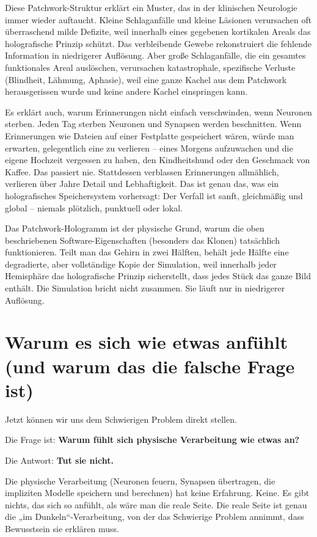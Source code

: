 \documentclass[11pt, twoside, openright]{book}
\begin{document}
Diese Patchwork-Struktur erklärt ein Muster, das in der klinischen Neurologie immer wieder auftaucht. Kleine Schlaganfälle und kleine Läsionen verursachen oft überraschend milde Defizite, weil innerhalb eines gegebenen kortikalen Areals das holografische Prinzip schützt. Das verbleibende Gewebe rekonstruiert die fehlende Information in niedrigerer Auflösung. Aber große Schlaganfälle, die ein gesamtes funktionales Areal auslöschen, verursachen katastrophale, spezifische Verluste (Blindheit, Lähmung, Aphasie), weil eine ganze Kachel aus dem Patchwork herausgerissen wurde und keine andere Kachel einspringen kann.

Es erklärt auch, warum Erinnerungen nicht einfach verschwinden, wenn Neuronen sterben. Jeden Tag sterben Neuronen und Synapsen werden beschnitten. Wenn Erinnerungen wie Dateien auf einer Festplatte gespeichert wären, würde man erwarten, gelegentlich eine zu verlieren -- eines Morgens aufzuwachen und die eigene Hochzeit vergessen zu haben, den Kindheitshund oder den Geschmack von Kaffee. Das passiert nie. Stattdessen verblassen Erinnerungen allmählich, verlieren über Jahre Detail und Lebhaftigkeit. Das ist genau das, was ein holografisches Speichersystem vorhersagt: Der Verfall ist sanft, gleichmäßig und global -- niemals plötzlich, punktuell oder lokal.

Das Patchwork-Hologramm ist der physische Grund, warum die oben beschriebenen Software-Eigenschaften (besonders das Klonen) tatsächlich funktionieren. Teilt man das Gehirn in zwei Hälften, behält jede Hälfte eine degradierte, aber vollständige Kopie der Simulation, weil innerhalb jeder Hemisphäre das holografische Prinzip sicherstellt, dass jedes Stück das ganze Bild enthält. Die Simulation bricht nicht zusammen. Sie läuft nur in niedrigerer Auflösung.

\chapter{Warum es sich wie etwas anfühlt (und warum das die falsche Frage ist)}

Jetzt können wir uns dem Schwierigen Problem direkt stellen.

Die Frage ist: \textbf{Warum fühlt sich physische Verarbeitung wie etwas an?}

Die Antwort: \textbf{Tut sie nicht.}

Die physische Verarbeitung (Neuronen feuern, Synapsen übertragen, die impliziten Modelle speichern und berechnen) hat keine Erfahrung. Keine. Es gibt nichts, das sich so anfühlt, als wäre man die reale Seite. Die reale Seite ist genau die „im Dunkeln“-Verarbeitung, von der das Schwierige Problem annimmt, dass Bewusstsein sie erklären muss.
\end{document}

